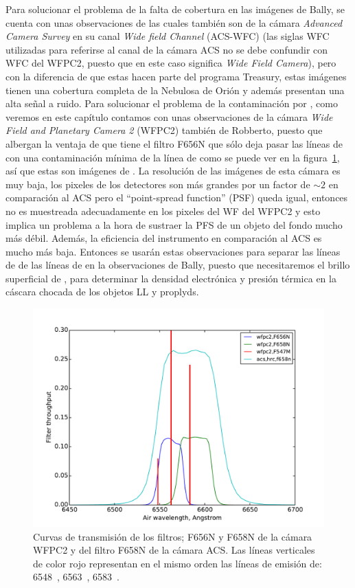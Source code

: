  Para solucionar el problema de la falta de cobertura en las imágenes de Bally, se cuenta con unas observaciones de \citet{Robberto:2013a} las cuales también son de la cámara \textit{Advanced Camera Survey} en su canal \textit{Wide field Channel} (ACS-WFC) (las siglas WFC utilizadas para referirse al canal de la cámara ACS no se debe confundir con WFC del WFPC2, puesto que en este caso significa \textit{Wide Field Camera}), pero con la diferencia de que estas hacen parte del programa Treasury, estas imágenes tienen una cobertura completa de la Nebulosa de Orión y además presentan una alta señal a ruido. Para solucionar el problema de la contaminación por \nii{}, como veremos en este capítulo contamos con unas observaciones de la cámara  \textit{Wide Field and Planetary Camera 2} (WFPC2) también de Robberto, puesto que albergan la ventaja de que tiene el filtro F656N que sólo deja pasar las líneas de \ha{} con una contaminación mínima de la línea de \nii{} como se puede ver en la figura~\ref{fig:transmision}, así que estas son imágenes de \ha{}. La resolución de las imágenes de esta cámara es muy baja, los pixeles de los detectores son más grandes por un factor de \(\sim2\) en comparación al ACS pero el ``point-spread function'' (PSF) queda igual, entonces no es muestreada adecuadamente en los pixeles del WF del WFPC2 y esto implica un problema a la hora de sustraer la PFS de un objeto del fondo mucho más débil. Además, la eficiencia del instrumento en comparación al ACS es mucho más baja. Entonces se usarán estas observaciones para separar las líneas de \ha{} de las líneas de \nii{} en la observaciones de Bally, puesto que necesitaremos el brillo superficial de \ha{}, para determinar la densidad electrónica y presión térmica en la cáscara chocada de los objetos LL y proplyds.\\

 \begin{figure}
   \centering
    \includegraphics[width=\linewidth, trim=0.7 0.7 0.7 30, clip]{luis-programas/will-filter}
   \caption{Curvas de transmisión de los filtros; F656N y F658N  de la cámara WFPC2 y del filtro F658N de la cámara ACS. Las líneas verticales de color rojo representan en el mismo orden las líneas de emisión de: \nii{} 6548~\A{}, \ha{} 6563~\A{}, \nii{} 6583~\A{}. }
   \label{fig:transmision}
 \end{figure}

